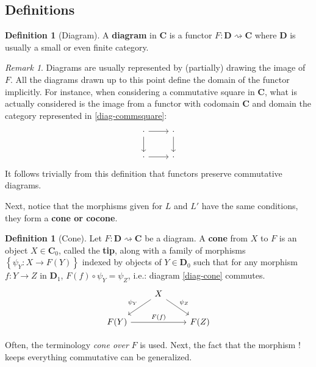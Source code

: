 \documentclass{article}
\theoremstyle{definition}
\newtheorem{defn}[thm]{Definition}
\theoremstyle{remark}
\newtheorem{rem}[thm]{Remark}
\begin{document}
\subsection{Definitions}
\begin{defn}[Diagram]
    A \textbf{diagram} in $\mathbf{C}$ is a functor $F:\mathbf{D}\rightsquigarrow \mathbf{C}$ where $\mathbf{D}$ is usually a small or even finite category.
\end{defn}
\begin{rem}
Diagrams are usually represented by (partially) drawing the image of $F$. All the diagrams drawn up to this point define the domain of the functor implicitly. For instance, when considering a commutative square in $\mathbf{C}$, what is actually considered is the image from a functor with codomain $\mathbf{C}$ and domain the category represented in \eqref{diag-commsquare}:
    \begin{equation}\label{diag-commsquare}
        \begin{tikzcd}
            \cdot \arrow[r] \arrow[d] & \cdot \arrow[d] \\
            \cdot \arrow[r] & \cdot
        \end{tikzcd}
    \end{equation}
    It follows trivially from this definition that functors preserve commutative diagrams.
\end{rem}
Next, notice that the morphisms given for $L$ and $L'$ have the same conditions, they form a \textbf{cone or cocone}.
\begin{defn}[Cone]
    Let $F: \mathbf{D}\rightsquigarrow \mathbf{C}$ be a diagram. A \textbf{cone} from $X$ to $F$ is an object $X \in \mathbf{C}_0$, called the \textbf{tip}, along with a family of morphisms $\left\{ \psi_Y: X \rightarrow F(Y)\right\}$ indexed by objects of $Y \in \mathbf{D}_0$ such that for any morphism $f:Y \rightarrow Z$ in $\mathbf{D}_1$, $F(f) \circ \psi_Y = \psi_Z$, i.e.: diagram \eqref{diag-cone} commutes.
    \begin{equation}\label{diag-cone}
        \begin{tikzcd}
            & X \arrow[ld, "\psi_Y"'] \arrow[rd, "\psi_Z"] &\\
            F(Y)\arrow[rr, "F(f)"] & & F(Z)
        \end{tikzcd}
    \end{equation}
\end{defn}
Often, the terminology \textit{cone over} $F$ is used. Next, the fact that the morphism $!$ keeps everything commutative can be generalized.
\end{document}
